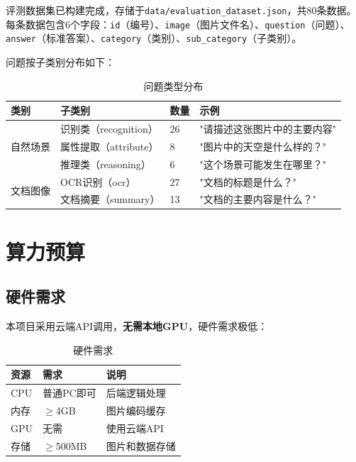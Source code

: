 评测数据集已构建完成，存储于\texttt{data/evaluation\_dataset.json}，共80条数据。每条数据包含6个字段：\texttt{id}（编号）、\texttt{image}（图片文件名）、\texttt{question}（问题）、\texttt{answer}（标准答案）、\texttt{category}（类别）、\texttt{sub\_category}（子类别）。

问题按子类别分布如下：

\begin{table}[htbp]
  \centering
  \caption{问题类型分布}
  \label{tab:question_type}
  \begin{tabular}{|l|l|l|l|}
    \hline
    \textbf{类别} & \textbf{子类别} & \textbf{数量} & \textbf{示例} \\
    \hline
    \multirow{3}{*}{自然场景} & 识别类（recognition） & 26 & "请描述这张图片中的主要内容" \\
    \cline{2-4}
     & 属性提取（attribute） & 8 & "图片中的天空是什么样的？" \\
    \cline{2-4}
     & 推理类（reasoning） & 6 & "这个场景可能发生在哪里？" \\
    \hline
    \multirow{2}{*}{文档图像} & OCR识别（ocr） & 27 & "文档的标题是什么？" \\
    \cline{2-4}
     & 文档摘要（summary） & 13 & "文档的主要内容是什么？" \\
    \hline
  \end{tabular}
\end{table}

\section{算力预算}
\label{sec:compute}

\subsection{硬件需求}

本项目采用云端API调用，\textbf{无需本地GPU}，硬件需求极低：

\begin{table}[htbp]
  \centering
  \caption{硬件需求}
  \label{tab:hardware}
  \begin{tabular}{|l|l|l|}
    \hline
    \textbf{资源} & \textbf{需求} & \textbf{说明} \\
    \hline
    CPU & 普通PC即可 & 后端逻辑处理 \\
    \hline
    内存 & $\geq$4GB & 图片编码缓存 \\
    \hline
    GPU & 无需 & 使用云端API \\
    \hline
    存储 & $\geq$500MB & 图片和数据存储 \\
    \hline
  \end{tabular}
\end{table}


